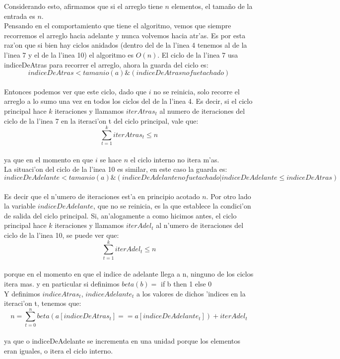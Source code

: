 Considerando esto, afirmamos que si el arreglo tiene $n$ elementos, el tama\~{n}o de la entrada es $n$.\\
Pensando en el comportamiento que tiene el algoritmo, vemos que siempre recorremos el arreglo hacia adelante 
y nunca volvemos hacia atr'as. Es por esta raz'on que si bien hay ciclos anidados (dentro del de la l'inea 
4 tenemos al de la l'inea 7 y el de la l'inea 10) el algoritmo es $O(n)$.
El ciclo de la l'inea 7 usa indiceDeAtras para recorrer el arreglo, ahora la guarda del ciclo es:\\
$$indiceDeAtras < tamanio(a) \& (indiceDeAtras no fue tachado)$$\\ 
Entonces podemos ver que este ciclo, dado que $i$ no se reinicia, solo recorre el arreglo a lo sumo una 
vez en todos los ciclos del de la l'inea 4. Es decir, si el ciclo principal hace $k$ iteraciones y llamamos 
$iterAtras_t$ al numero de iteraciones del ciclo de la l'inea 7 en la iteraci'on t del ciclo principal, vale que:\\
$$\sum_{t=1}^{k}iterAtras_t \leq n$$\\
ya que en el momento en que $i$ se hace $n$ el ciclo interno no itera m'as.\\
La situaci'on del ciclo de la l'inea 10 es similar, en este caso la guarda es:\\
$$indiceDeAdelante < tamanio(a) \& (indiceDeAdelante no fue tachado | indiceDeAdelante \leq indiceDeAtras)$$\\
Es decir que el n'umero de iteraciones est'a en principio acotado $n$. Por otro lado la variable $indiceDeAdelante$, 
que no se reinicia, es la que establece la condici'on de salida del ciclo principal. Si, an'alogamente a como hicimos 
antes, el ciclo principal hace $k$ iteraciones y llamamos $iterAdel_t$ al n'umero de iteraciones del ciclo de 
la l'inea 10, se puede ver que:\\
$$\sum_{t=1}^{k}iterAdel_t \leq n$$\\ porque en el momento en que el indice de adelante llega a n, ninguno de los ciclos itera mas.
y en particular si definimos
$beta(b) =$ if b then 1 else 0 \\
Y definimos $indiceAtras_t$, $indiceAdelante_t$ a los valores de dichos 'indices en la iteraci'on t, tenemos que:\\
$$n=\sum_{t=0}^{n}beta(a[indiceDeAtras_t] == a[indiceDeAdelante_t])+ iterAdel_t$$\\
ya que o indiceDeAdelante se incrementa en una unidad porque los elementos eran iguales, o itera el ciclo interno.\\

